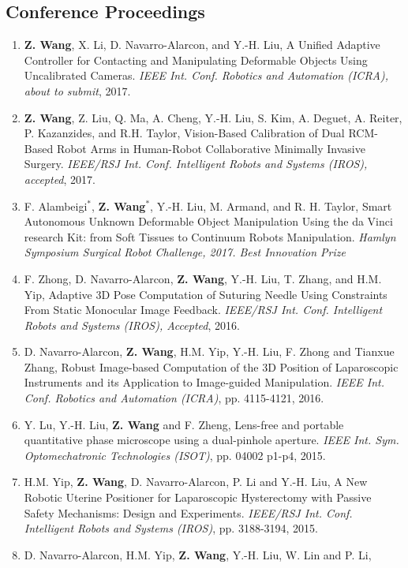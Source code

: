 \documentclass[10pt,letterpaper]{article}
\begin{document}
\subsection*{Conference Proceedings}
\begin{enumerate}
\item \textbf{Z. Wang}, X. Li, D. Navarro-Alarcon, and Y.-H. Liu,
  A Unified Adaptive Controller for Contacting and Manipulating Deformable Objects Using Uncalibrated Cameras.
  \textit{{IEEE} Int. Conf. Robotics and Automation (ICRA), about to submit}, 2017.
\item \textbf{Z. Wang}, Z. Liu, Q. Ma, A. Cheng, Y.-H. Liu, S. Kim, A. Deguet, A. Reiter, P. Kazanzides, and R.H. Taylor,
  Vision-Based Calibration of Dual RCM-Based Robot Arms in Human-Robot Collaborative Minimally Invasive Surgery.
  \textit{{IEEE/RSJ} Int. Conf. Intelligent Robots and Systems (IROS), accepted}, 2017.
\item F. Alambeigi$^*$, \textbf{Z. Wang}$^*$, Y.-H. Liu, M. Armand, and R. H. Taylor,
  Smart Autonomous Unknown Deformable Object Manipulation Using the da Vinci research Kit: from Soft Tissues to Continuum Robots Manipulation.
  \textit{Hamlyn Symposium Surgical Robot Challenge, 2017. Best Innovation Prize}
\item F. Zhong, D. Navarro-Alarcon, \textbf{Z. Wang}, Y.-H. Liu, T. Zhang, and H.M. Yip,
  Adaptive 3D Pose Computation of Suturing Needle Using Constraints From Static Monocular Image Feedback.
  \textit{{IEEE/RSJ} Int. Conf. Intelligent Robots and Systems (IROS), Accepted}, 2016.
\item D. Navarro-Alarcon, \textbf{Z. Wang}, H.M. Yip, Y.-H. Liu, F. Zhong and Tianxue Zhang,
  Robust Image-based Computation of the 3D Position of Laparoscopic Instruments and its Application to Image-guided Manipulation.
  \textit{{IEEE} Int. Conf. Robotics and Automation (ICRA)}, pp. 4115-4121, 2016.
\item Y. Lu, Y.-H. Liu, \textbf{Z. Wang} and F. Zheng,
  Lens-free and portable quantitative phase microscope using a dual-pinhole aperture.
  \textit{{IEEE} Int. Sym. Optomechatronic Technologies (ISOT)}, pp. 04002 p1-p4, 2015.
\item H.M. Yip, \textbf{Z. Wang}, D. Navarro-Alarcon, P. Li and Y.-H. Liu,
  A New Robotic Uterine Positioner for Laparoscopic Hysterectomy with Passive Safety Mechanisms: Design and Experiments.
  \textit{{IEEE/RSJ} Int. Conf. Intelligent Robots and Systems (IROS)}, pp. 3188-3194, 2015.
\item D. Navarro-Alarcon, H.M. Yip, \textbf{Z. Wang}, Y.-H. Liu, W. Lin and P. Li,

\end{enumerate}
\end{document}
